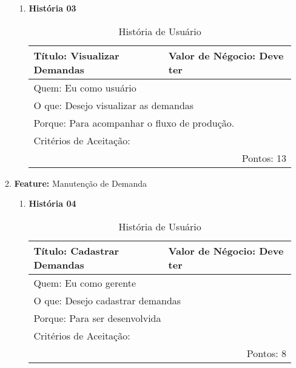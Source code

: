 \begin{enumerate}
\begin{enumerate}
\begin{enumerate}
						\item \textbf{História 03}
						\begin{table}[H]
							\begin{tabular}{|p{10cm}|l|}
								\hline 
								Título: Visualizar Demandas & Valor de Négocio: Deve ter\tabularnewline
								\hline 
								\multicolumn{2}{|l|}{Quem: Eu como usuário }\tabularnewline
								\hline 
								\multicolumn{2}{|l|}{O que: Desejo visualizar as demandas}\tabularnewline
								\hline 
								\multicolumn{2}{|l|}{Porque: Para acompanhar o fluxo de produção.}\tabularnewline
								\hline 
								\multicolumn{2}{|l|}{Critérios de Aceitação:}
								\tabularnewline
								\hline 
								\multicolumn{2}{|r|}{Pontos: 13}\tabularnewline
								\hline 
							\end{tabular}
							\caption{História de Usuário}
							\label{Historia_de_Usuario}
						\end{table}
				\end{enumerate}
			\item \textbf{Feature:} Manutenção de Demanda
				\begin{enumerate}
					\item \textbf{História 04}
						\begin{table}[H]
							\begin{tabular}{|p{10cm}|l|}
								\hline 
								Título: Cadastrar Demandas & Valor de Négocio: Deve ter\tabularnewline
								\hline 
								\multicolumn{2}{|l|}{Quem: Eu como gerente}\tabularnewline
								\hline 
								\multicolumn{2}{|l|}{O que: Desejo cadastrar demandas}\tabularnewline
								\hline 
								\multicolumn{2}{|l|}{Porque: Para ser desenvolvida}\tabularnewline
								\hline 
								\multicolumn{2}{|l|}{Critérios de Aceitação:}
								\tabularnewline
								\hline 
								\multicolumn{2}{|r|}{Pontos: 8}\tabularnewline
								\hline 
							\end{tabular}
							\caption{História de Usuário}
							\label{Historia_de_Usuario}
						\end{table}


\end{enumerate}
\end{enumerate}
\end{enumerate}
